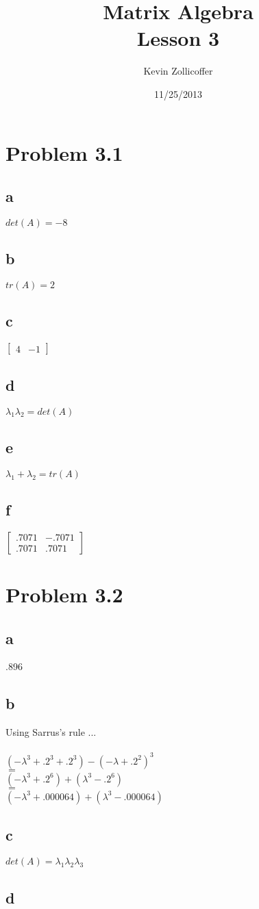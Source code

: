\documentclass{article}
\author{Kevin Zollicoffer}
\title{Matrix Algebra\\Lesson 3}
\date{11/25/2013}
\begin{document}
\maketitle


\section*{Problem 3.1}
\subsection*{a}
$ det(A) = -8$

\subsection*{b}
$tr(A) = 2$ 

\subsection*{c}
$  
\begin{bmatrix}
  4 & -1
\end{bmatrix}
$

\subsection*{d}
$\lambda_1\lambda_2 = det(A)$
\subsection*{e}
$\lambda_1+\lambda_2 = tr(A)$
\subsection*{f}
$  
\begin{bmatrix}
  .7071 & -.7071 \\
  .7071 & .7071
\end{bmatrix}
$


\section*{Problem 3.2}
\subsection*{a}
.896

\subsection*{b}
Using Sarrus's rule ...
\\\\
$(-\lambda^3+.2^3+.2^3) - (-\lambda+.2^2)^3  $
\\$=$\\
$ (-\lambda^3+.2^6) + (\lambda^3-.2^6)  $
\\$=$\\
$ (-\lambda^3+.000064) + (\lambda^3-.000064)  $

\subsection*{c}
$det(A) = \lambda_1\lambda_2\lambda_3$


\subsection*{d}
\end{document}
